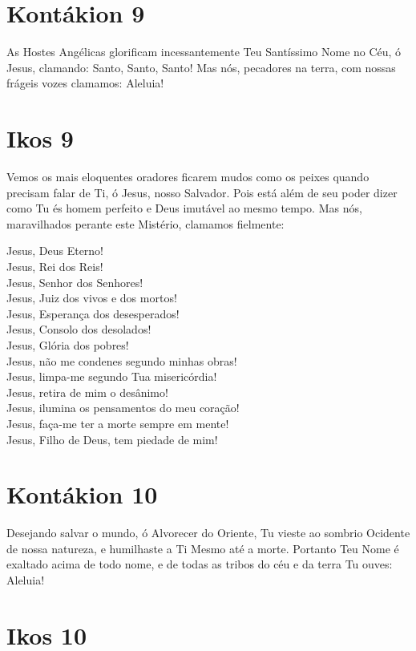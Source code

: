 \documentclass{subfiles}
\begin{document}
\section{Kontákion 9}

As Hostes Angélicas glorificam incessantemente Teu Santíssimo Nome
no Céu, ó Jesus, clamando: Santo, Santo, Santo! Mas nós, pecadores na terra,
com nossas frágeis vozes clamamos: Aleluia!

\section{Ikos 9}

Vemos os mais eloquentes oradores ficarem mudos como os peixes
quando precisam falar de Ti, ó Jesus, nosso Salvador. Pois está além de seu
poder dizer como Tu és homem perfeito e Deus imutável ao mesmo tempo.
Mas nós, maravilhados perante este Mistério, clamamos fielmente:

Jesus, Deus Eterno! \\
Jesus, Rei dos Reis! \\
Jesus, Senhor dos Senhores! \\
Jesus, Juiz dos vivos e dos mortos! \\
Jesus, Esperança dos desesperados! \\
Jesus, Consolo dos desolados! \\
Jesus, Glória dos pobres! \\
Jesus, não me condenes segundo minhas obras! \\
Jesus, limpa-me segundo Tua misericórdia! \\
Jesus, retira de mim o desânimo! \\
Jesus, ilumina os pensamentos do meu coração! \\
Jesus, faça-me ter a morte sempre em mente! \\
Jesus, Filho de Deus, tem piedade de mim!

\section{Kontákion 10}

Desejando salvar o mundo, ó Alvorecer do Oriente, Tu vieste ao
sombrio Ocidente de nossa natureza, e humilhaste a Ti Mesmo até a morte.
Portanto Teu Nome é exaltado acima de todo nome, e de todas as tribos do
céu e da terra Tu ouves: Aleluia!

\section{Ikos 10}
\end{document}
